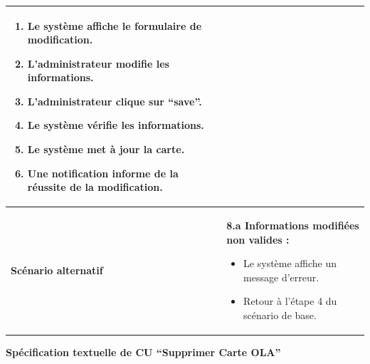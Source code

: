 \documentclass[a4paper,11pt]{report}
\begin{document}
\begin{table}[H]
\begin{tabularx}{\textwidth}{|l|X|}
\begin{enumerate}
      \item Le système affiche le formulaire de modification.
      \item L’administrateur modifie les informations.
      \item L’administrateur clique sur “save”.
      \item Le système vérifie les informations.
      \item Le système met à jour la carte.
      \item Une notification informe de la réussite de la modification.
    \end{enumerate} \\ \hline
    \textbf{Scénario alternatif} & 
    \textbf{8.a Informations modifiées non valides :}
    \begin{itemize}
      \item Le système affiche un message d’erreur.
      \item Retour à l’étape 4 du scénario de base.
    \end{itemize} \\ \hline
  \end{tabularx}
\end{table}
\newpage
\textbf{Spécification textuelle de CU “Supprimer Carte OLA”}
\end{document}
